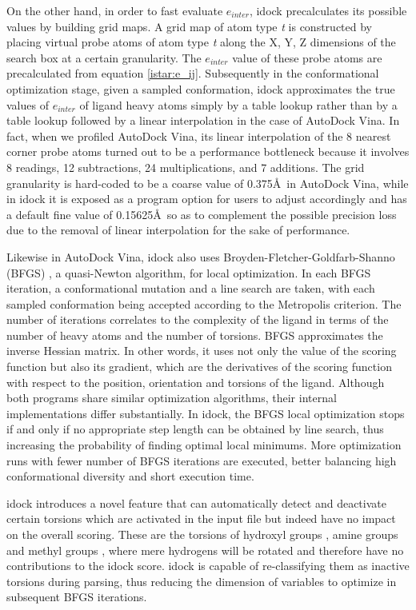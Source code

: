 On the other hand, in order to fast evaluate $e_{inter}$, idock precalculates its possible values by building grid maps. A grid map of atom type \textit{t} is constructed by placing virtual probe atoms of atom type \textit{t} along the X, Y, Z dimensions of the search box at a certain granularity. The $e_{inter}$ value of these probe atoms are precalculated from equation \eqref{istar:e_ij}. Subsequently in the conformational optimization stage, given a sampled conformation, idock approximates the true values of $e_{inter}$ of ligand heavy atoms simply by a table lookup rather than by a table lookup followed by a linear interpolation in the case of AutoDock Vina. In fact, when we profiled AutoDock Vina, its linear interpolation of the 8 nearest corner probe atoms turned out to be a performance bottleneck because it involves 8 readings, 12 subtractions, 24 multiplications, and 7 additions. The grid granularity is hard-coded to be a coarse value of 0.375\AA\ in AutoDock Vina, while in idock it is exposed as a program option for users to adjust accordingly and has a default fine value of 0.15625\AA\ so as to complement the possible precision loss due to the removal of linear interpolation for the sake of performance.

Likewise in AutoDock Vina, idock also uses Broyden-Fletcher-Goldfarb-Shanno (BFGS) \citep{786}, a quasi-Newton algorithm, for local optimization. In each BFGS iteration, a conformational mutation and a line search are taken, with each sampled conformation being accepted according to the Metropolis criterion. The number of iterations correlates to the complexity of the ligand in terms of the number of heavy atoms and the number of torsions. BFGS approximates the inverse Hessian matrix. In other words, it uses not only the value of the scoring function but also its gradient, which are the derivatives of the scoring function with respect to the position, orientation and torsions of the ligand. Although both programs share similar optimization algorithms, their internal implementations differ substantially. In idock, the BFGS local optimization stops if and only if no appropriate step length can be obtained by line search, thus increasing the probability of finding optimal local minimums. More optimization runs with fewer number of BFGS iterations are executed, better balancing high conformational diversity and short execution time.

idock introduces a novel feature that can automatically detect and deactivate certain torsions which are activated in the input file but indeed have no impact on the overall scoring. These are the torsions of hydroxyl groups , amine groups  and methyl groups , where mere hydrogens will be rotated and therefore have no contributions to the idock score. idock is capable of re-classifying them as inactive torsions during parsing, thus reducing the dimension of variables to optimize in subsequent BFGS iterations.

